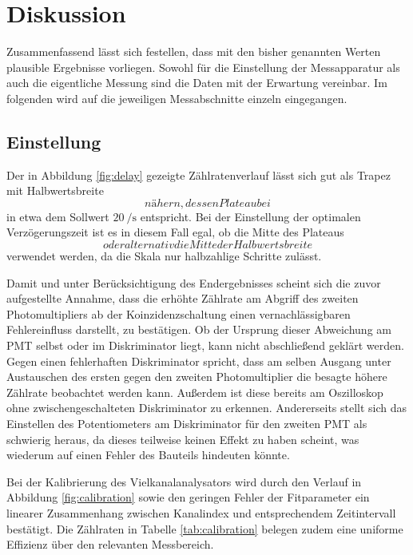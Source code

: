 \section{Diskussion}

Zusammenfassend lässt sich festellen, dass mit den bisher genannten Werten plausible Ergebnisse
vorliegen. Sowohl für die Einstellung der Messapparatur als auch die eigentliche Messung sind die
Daten mit der Erwartung vereinbar. Im folgenden wird auf die jeweiligen Messabschnitte einzeln
eingegangen.



\subsection{Einstellung}

Der in Abbildung \eqref{fig:delay} gezeigte Zählratenverlauf lässt sich gut als Trapez mit Halbwertsbreite
$$ nähern, dessen Plateau bei $$ in etwa dem Sollwert
$\qty{20}{\per\second}$ entspricht. Bei der Einstellung der optimalen Verzögerungszeit ist es in diesem
Fall egal, ob die Mitte des Plateaus $$ oder alternativ die Mitte der Halbwertsbreite
$$ verwendet werden, da die Skala nur halbzahlige Schritte zulässt.

Damit und unter Berücksichtigung des Endergebnisses scheint sich die zuvor aufgestellte Annahme, dass die
erhöhte Zählrate am Abgriff des zweiten Photomultipliers ab der Koinzidenzschaltung einen vernachlässigbaren
Fehlereinfluss darstellt, zu bestätigen. Ob der Ursprung dieser Abweichung am PMT
selbst oder im Diskriminator liegt, kann nicht abschließend geklärt werden. Gegen einen fehlerhaften
Diskriminator spricht, dass am selben Ausgang unter Austauschen des ersten gegen den zweiten
Photomultiplier die besagte höhere Zählrate beobachtet werden kann. Außerdem ist diese bereits
am Oszilloskop ohne zwischengeschalteten Diskriminator zu erkennen. Andererseits stellt sich das
Einstellen des Potentiometers am Diskriminator für den zweiten PMT als schwierig
heraus, da dieses teilweise keinen Effekt zu haben scheint, was wiederum auf einen Fehler des
Bauteils hindeuten könnte.

Bei der Kalibrierung des Vielkanalanalysators wird durch den Verlauf in Abbildung \eqref{fig:calibration}
sowie den geringen Fehler der Fitparameter ein linearer Zusammenhang zwischen Kanalindex und entsprechendem
Zeitintervall bestätigt. Die Zählraten in Tabelle \eqref{tab:calibration} belegen zudem eine uniforme Effizienz
über den relevanten Messbereich.



